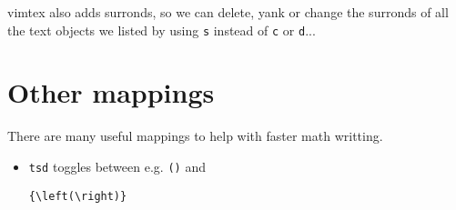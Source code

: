 \documentclass[12pt, a4paper, oneside]{book}
\begin{document}
vimtex also adds surronds, so we can delete, yank or change the surronds of
all the text objects we listed by using \texttt{s} instead of \texttt{c} or
\texttt{d}...

\section{Other mappings}

There are many useful mappings to help with faster math writting.

\begin{itemize}
    \item \texttt{tsd} toggles between e.g. \texttt{()} and
        \begin{verbatim}{\left(\right)}\end{verbatim}
\end{itemize}



\end{document}
